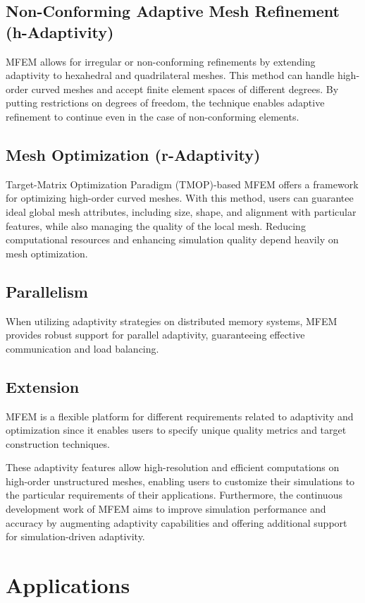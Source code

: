 \documentclass{article}
\begin{document}
\subsection{Non-Conforming Adaptive Mesh Refinement (h-Adaptivity)}
MFEM allows for irregular or non-conforming refinements by extending adaptivity to hexahedral and quadrilateral meshes. This method can handle high-order curved meshes and accept finite element spaces of different degrees. By putting restrictions on degrees of freedom, the technique enables adaptive refinement to continue even in the case of non-conforming elements.

\subsection{Mesh Optimization (r-Adaptivity)}
Target-Matrix Optimization Paradigm (TMOP)-based MFEM offers a framework for optimizing high-order curved meshes. With this method, users can guarantee ideal global mesh attributes, including size, shape, and alignment with particular features, while also managing the quality of the local mesh. Reducing computational resources and enhancing simulation quality depend heavily on mesh optimization.
\subsection{Parallelism}
When utilizing adaptivity strategies on distributed memory systems, MFEM provides robust support for parallel adaptivity, guaranteeing effective communication and load balancing.

\subsection{Extension}
MFEM is a flexible platform for different requirements related to adaptivity and optimization since it enables users to specify unique quality metrics and target construction techniques.

These adaptivity features allow high-resolution and efficient computations on high-order unstructured meshes, enabling users to customize their simulations to the particular requirements of their applications. Furthermore, the continuous development work of MFEM aims to improve simulation performance and accuracy by augmenting adaptivity capabilities and offering additional support for simulation-driven adaptivity.

\section{Applications}
\end{document}
